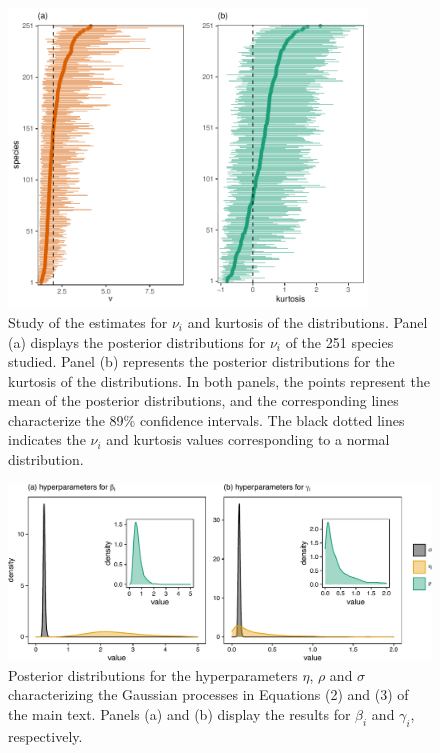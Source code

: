 \documentclass[11pt, a4paper]{article}
\begin{document}
\begin{figure}[ht]
  \centering
    \vspace{0.5cm}
    \includegraphics[width=0.85\textwidth]{figures/nu-kurtosis}
    	  \vspace{0.3cm}
	   \caption{Study of the estimates for $\nu_i$ and kurtosis of the distributions. Panel (a) displays the posterior distributions for $\nu_i$ of the 251 species studied. Panel (b) represents the posterior distributions for the kurtosis of the distributions. In both panels, the points represent the mean of the posterior distributions, and the corresponding lines characterize the 89\% confidence intervals. The black dotted lines indicates the $\nu_i$ and kurtosis values corresponding to a normal distribution.}
      \label{sfig:nu-kurtosis}
\end{figure}

\clearpage

\begin{figure}[ht]
  \centering
    \vspace{0.5cm}
    \includegraphics[width=1\textwidth]{figures/hyperparameters-supplementary}
    	  \vspace{0.3cm}
	   \caption{Posterior distributions for the hyperparameters $\eta$, $\rho$ and $\sigma$ characterizing the Gaussian processes in Equations (2) and (3) of the main text. Panels (a) and (b) display the results for $\beta_i$ and $\gamma_i$, respectively.}
      \label{sfig:hyperparameters1}
\end{figure}
\end{document}
